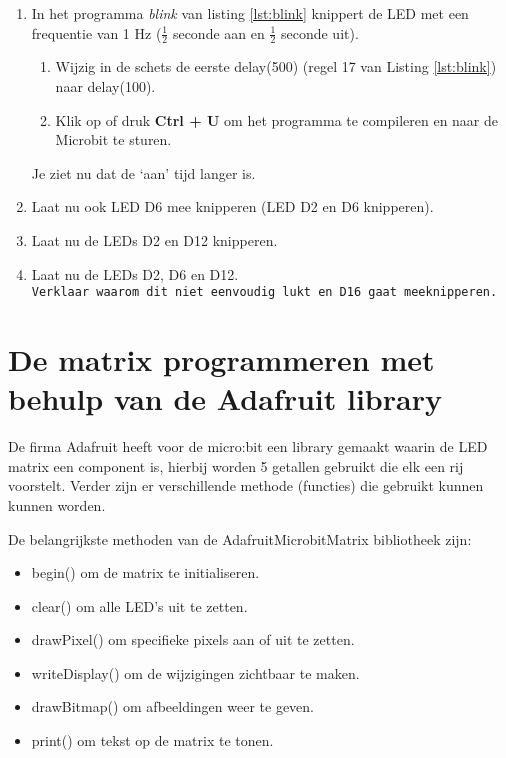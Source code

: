 \begin{enumerate}
	
\item In het programma \textit{blink} van listing \ref{lst:blink} knippert de LED met een frequentie van 1 Hz ($\frac{1}{2}$ seconde aan en $\frac{1}{2}$ seconde uit).\\
\begin{enumerate}
	\item Wijzig in de schets de eerste \textcolor{BurntOrange}{delay}(500) (regel 17 van Listing \ref{lst:blink}) naar \textcolor{BurntOrange}{delay}(100).
	\item   Klik op  of druk \colorbox{mygray}{\textbf{Ctrl + U}} om het programma te compileren en naar de Microbit te sturen.
\end{enumerate}

Je ziet nu dat de ‘aan’ tijd langer is.
\item Laat nu ook LED D6 mee knipperen (LED D2 en D6 knipperen).

\item Laat nu de LEDs D2 en D12 knipperen.

\item Laat nu de LEDs D2, D6 en D12.\\ 
\texttt{Verklaar waarom dit niet eenvoudig lukt en D16 gaat meeknipperen.}



\end{enumerate}

\section{De matrix programmeren met behulp van de Adafruit library}\label{sec:matrix}

De firma Adafruit heeft voor de micro:bit een library gemaakt waarin de LED matrix een component is, hierbij worden 5 getallen gebruikt die elk een rij voorstelt. Verder zijn er verschillende methode (functies) die gebruikt kunnen kunnen worden.

De belangrijkste methoden van de Adafruit\textunderscore Microbit\textunderscore Matrix bibliotheek zijn:
\begin{itemize}
	\item begin() om de matrix te initialiseren.
	\item clear() om alle LED's uit te zetten.
	\item drawPixel() om specifieke pixels aan of uit te zetten.
	\item writeDisplay() om de wijzigingen zichtbaar te maken.
	\item drawBitmap() om afbeeldingen weer te geven.
	\item print() om tekst op de matrix te tonen.
\end{itemize}

